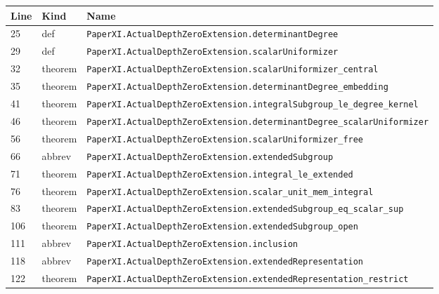 \documentclass[10pt,oneside]{book}
\begin{document}
\begin{longtable}{@{}p{}p{}p{}@{}}\toprule Line&Kind&Name\\\midrule\endhead

25&def&\nolinkurl{PaperXI.ActualDepthZeroExtension.determinantDegree}\\

29&def&\nolinkurl{PaperXI.ActualDepthZeroExtension.scalarUniformizer}\\

32&theorem&\nolinkurl{PaperXI.ActualDepthZeroExtension.scalarUniformizer_central}\\

35&theorem&\nolinkurl{PaperXI.ActualDepthZeroExtension.determinantDegree_embedding}\\

41&theorem&\nolinkurl{PaperXI.ActualDepthZeroExtension.integralSubgroup_le_degree_kernel}\\

46&theorem&\nolinkurl{PaperXI.ActualDepthZeroExtension.determinantDegree_scalarUniformizer}\\

56&theorem&\nolinkurl{PaperXI.ActualDepthZeroExtension.scalarUniformizer_free}\\

66&abbrev&\nolinkurl{PaperXI.ActualDepthZeroExtension.extendedSubgroup}\\

71&theorem&\nolinkurl{PaperXI.ActualDepthZeroExtension.integral_le_extended}\\

76&theorem&\nolinkurl{PaperXI.ActualDepthZeroExtension.scalar_unit_mem_integral}\\

83&theorem&\nolinkurl{PaperXI.ActualDepthZeroExtension.extendedSubgroup_eq_scalar_sup}\\

106&theorem&\nolinkurl{PaperXI.ActualDepthZeroExtension.extendedSubgroup_open}\\

111&abbrev&\nolinkurl{PaperXI.ActualDepthZeroExtension.inclusion}\\

118&abbrev&\nolinkurl{PaperXI.ActualDepthZeroExtension.extendedRepresentation}\\

122&theorem&\nolinkurl{PaperXI.ActualDepthZeroExtension.extendedRepresentation_restrict}\\


\end{longtable}
\end{document}
